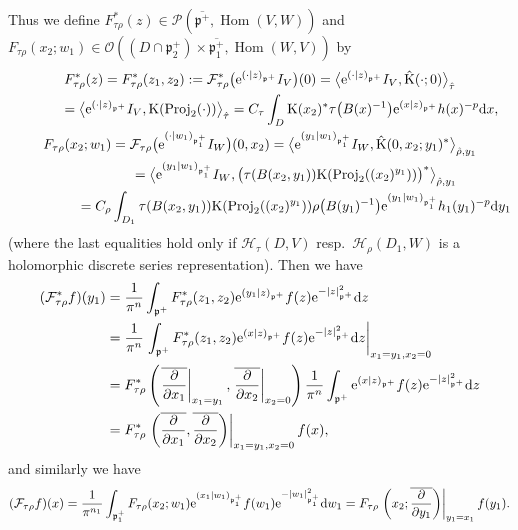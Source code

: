 \documentclass[pdftex]{sigma}
\numberwithin{equation}{section}
\newcommand{\fp}{\mathfrak{p}}
\newcommand{\cF}{\mathcal{F}}
\newcommand{\cH}{\mathcal{H}}
\newcommand{\cO}{\mathcal{O}}
\newcommand{\cP}{\mathcal{P}}
\newcommand{\rK}{\mathrm{K}}
\newcommand{\Hom}{\operatorname{Hom}}
\newcommand{\Proj}{\operatorname{Proj}}
\begin{document}
Thus we define $F_{\tau\rho}^*(z)\in\cP(\overline{\fp^+},\Hom(V,W))$ and
$F_{\tau\rho}(x_2;w_1)\in\cO((D\cap\fp^+_2)\times\overline{\fp^+_1},\allowbreak\Hom(W,V))$ by
\begin{gather*}
F_{\tau\rho}^*(z)=F_{\tau\rho}^*(z_1,z_2):=\cF_{\tau\rho}^*\big({\rm e}^{(\cdot|z)_{\fp^+}}I_V\big)(0)
=\big\langle {\rm e}^{(\cdot|z)_{\fp^+}}I_V,\hat{\rK}(\cdot;0)\big\rangle_{\hat{\tau}} \\
\hphantom{F_{\tau\rho}^*(z)}{} =\big\langle {\rm e}^{(\cdot|z)_{\fp^+}}I_V,\rK(\Proj_2(\cdot))\big\rangle_{\hat{\tau}}
=C_\tau\int_D \rK(x_2)^*\tau\big(B(x)^{-1}\big){\rm e}^{(x|z)_{\fp^+}}h(x)^{-p}{\rm d}x,\\
F_{\tau\rho}(x_2;w_1)=\cF_{\tau\rho}\big({\rm e}^{(\cdot|w_1)_{\fp^+_1}}I_W\big)(0,x_2)
=\big\langle {\rm e}^{(y_1|w_1)_{\fp^+_1}}I_W,\hat{\rK}(0,x_2;y_1)^*\big\rangle_{\hat{\rho},y_1}\\
\hphantom{F_{\tau\rho}(x_2;w_1)}{}=\big\langle {\rm e}^{(y_1|w_1)_{\fp^+_1}}I_W,\bigl(\tau(B(x_2,y_1))\rK(\Proj_2((x_2)^{y_1}))\bigr)^*\big\rangle_{\hat{\rho},y_1}\\
\hphantom{F_{\tau\rho}(x_2;w_1)}{}=C_\rho\int_{D_1} \tau(B(x_2,y_1))\rK(\Proj_2((x_2)^{y_1}))\rho\big(B(y_1)^{-1}\big){\rm e}^{(y_1|w_1)_{\fp^+_1}}h_1(y_1)^{-p}{\rm d}y_1
\end{gather*}
(where the last equalities hold only if $\cH_\tau(D,V)$ resp.~$\cH_\rho(D_1,W)$ is a holomorphic discrete series representation).
Then we have
\begin{align*}
(\cF_{\tau\rho}^*f)(y_1)&=\frac{1}{\pi^n}\int_{\fp^+}F_{\tau\rho}^*(z_1,z_2){\rm e}^{(y_1|z)_{\fp^+}}f(z){\rm e}^{-|z|_{\fp^+}^2}{\rm d}z\\
&=\frac{1}{\pi^n}\left.\int_{\fp^+}F_{\tau\rho}^*(z_1,z_2){\rm e}^{(x|z)_{\fp^+}}f(z){\rm e}^{-|z|_{\fp^+}^2}{\rm d}z\right|_{x_1=y_1,x_2=0}\\
&=F_{\tau\rho}^*\left(\left.\overline{\frac{\partial}{\partial x_1}}\right|_{x_1=y_1},
\left.\overline{\frac{\partial}{\partial x_2}}\right|_{x_2=0}\right)
\frac{1}{\pi^n}\int_{\fp^+}{\rm e}^{(x|z)_{\fp^+}}f(z){\rm e}^{-|z|_{\fp^+}^2}{\rm d}z\\
&=F_{\tau\rho}^*\left.\left(\overline{\frac{\partial}{\partial x_1}},\overline{\frac{\partial}{\partial x_2}}\right)\right|_{x_1=y_1,x_2=0}f(x),
\end{align*}
and similarly we have
\begin{gather*}
(\cF_{\tau\rho}f)(x) =\frac{1}{\pi^{n_1}}\int_{\fp^+_1}F_{\tau\rho}(x_2;w_1){\rm e}^{(x_1|w_1)_{\fp^+_1}}f(w_1){\rm e}^{-|w_1|_{\fp^+_1}^2}{\rm d}w_1
=F_{\tau\rho}\left.\left(x_2;\overline{\frac{\partial}{\partial y_1}}\right)\right|_{y_1=x_1}f(y_1).
\end{gather*}
\end{document}
